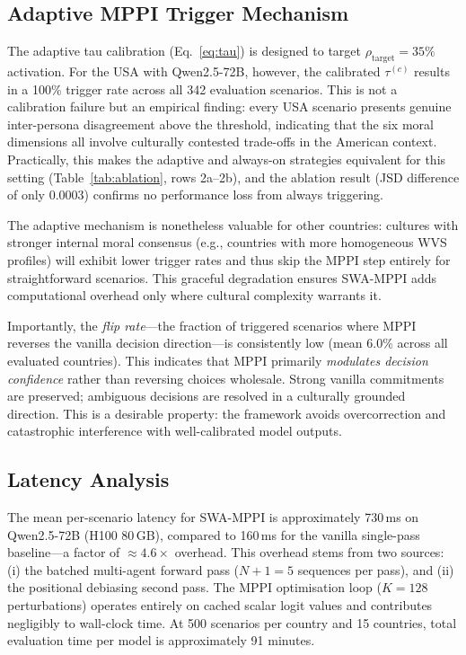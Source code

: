 \documentclass{article}
\begin{document}
\subsection{Adaptive MPPI Trigger Mechanism}
\label{sec:analysis:trigger}

The adaptive tau calibration (Eq.~\ref{eq:tau}) is designed to target $\rho_{\text{target}}=35\%$
activation. For the USA with Qwen2.5-72B, however, the calibrated $\tau^{(c)}$ results
in a 100\% trigger rate across all 342 evaluation scenarios.
This is not a calibration failure but an empirical finding: every USA scenario presents
genuine inter-persona disagreement above the threshold, indicating that the six moral
dimensions all involve culturally contested trade-offs in the American context.
Practically, this makes the adaptive and always-on strategies equivalent for this setting
(Table~\ref{tab:ablation}, rows 2a--2b), and the ablation result (JSD difference of only 0.0003)
confirms no performance loss from always triggering.

The adaptive mechanism is nonetheless valuable for other countries: cultures with stronger
internal moral consensus (e.g., countries with more homogeneous WVS profiles) will exhibit
lower trigger rates and thus skip the MPPI step entirely for straightforward scenarios.
This graceful degradation ensures SWA-MPPI adds computational overhead only where
cultural complexity warrants it.

Importantly, the \emph{flip rate}---the fraction of triggered scenarios where MPPI
reverses the vanilla decision direction---is consistently low (mean 6.0\% across all
evaluated countries). This indicates that MPPI primarily \emph{modulates decision confidence}
rather than reversing choices wholesale. Strong vanilla commitments are preserved;
ambiguous decisions are resolved in a culturally grounded direction. This is a desirable
property: the framework avoids overcorrection and catastrophic interference with
well-calibrated model outputs.

\subsection{Latency Analysis}
\label{sec:analysis:latency}

The mean per-scenario latency for SWA-MPPI is approximately 730\,ms on Qwen2.5-72B
(H100 80\,GB), compared to 160\,ms for the vanilla single-pass baseline---a factor of
$\approx 4.6\times$ overhead. This overhead stems from two sources: (i) the batched
multi-agent forward pass ($N+1=5$ sequences per pass), and (ii) the positional debiasing
second pass. The MPPI optimisation loop ($K=128$ perturbations) operates entirely on
cached scalar logit values and contributes negligibly to wall-clock time. At 500 scenarios
per country and 15 countries, total evaluation time per model is approximately 91 minutes.
\end{document}
